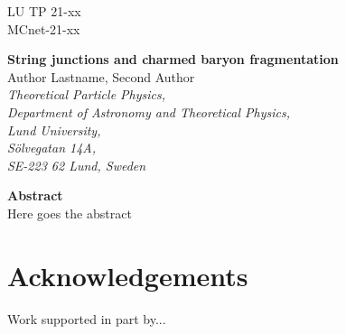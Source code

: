 \documentclass[12pt,a4paper]{article}
\newlength{\abstwidth}
\begin{document}
\sloppy
 
\pagestyle{empty}
 
\begin{flushright}
LU TP 21-xx\\
MCnet-21-xx\\
\end{flushright}

\vspace{\fill}

\begin{center}
{\Huge\bf String junctions and charmed baryon fragmentation}\\[4mm]
{\Large Author Lastname, Second Author} \\[3mm]
{\it Theoretical Particle Physics,}\\[1mm]
{\it Department of Astronomy and Theoretical Physics,}\\[1mm]
{\it Lund University,}\\[1mm]
{\it S\"olvegatan 14A,}\\[1mm]
{\it SE-223 62 Lund, Sweden}
\end{center}

\vspace{\fill}

\begin{center}
\begin{minipage}{\abstwidth}
{\bf Abstract}\\[2mm]
Here goes the abstract
\end{minipage}
\end{center}

\vspace{\fill}

\phantom{dummy}

\clearpage

\pagestyle{plain}
\setcounter{page}{1}





\section*{Acknowledgements}

Work supported in part by...






\end{document}
